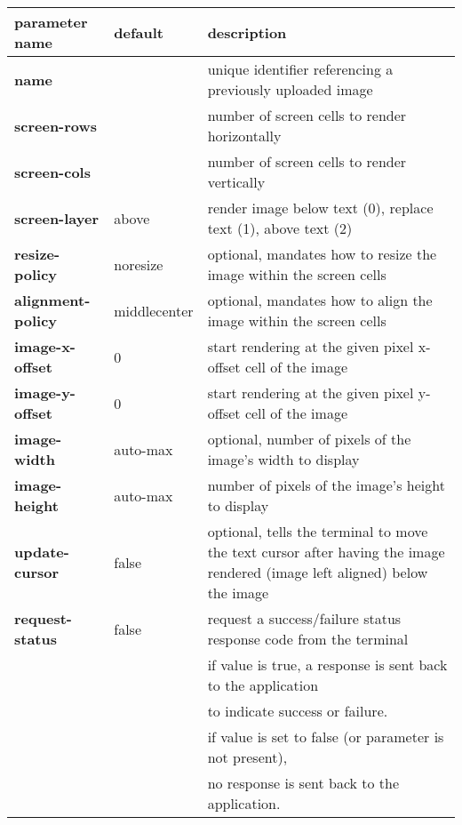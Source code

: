 \documentclass[a4paper]{article}
\begin{document}
\begin{tabular}{|m{3cm}|m{2cm}|m{10cm}|}
    \hline
    \textbf{parameter name}   & \textbf{default} & \textbf{description} \\
    \hline
    \textbf{name}             &                  & unique identifier referencing a previously uploaded image \\
    \textbf{screen-rows}      &                  & number of screen cells to render horizontally \\
    \textbf{screen-cols}      &                  & number of screen cells to render vertically \\
    \textbf{screen-layer}     & above            & render image below text (0), replace text (1), above text (2) \\
    \textbf{resize-policy}    & noresize         & optional, mandates how to resize the image within the screen cells \\
    \textbf{alignment-policy} & middlecenter     & optional, mandates how to align the image within the screen cells \\
    \textbf{image-x-offset}   & 0                & start rendering at the given pixel x-offset cell of the image \\
    \textbf{image-y-offset}   & 0                & start rendering at the given pixel y-offset cell of the image \\
    \textbf{image-width}      & auto-max         & optional, number of pixels of the image's width to display \\
    \textbf{image-height}     & auto-max         & number of pixels of the image's height to display \\
    \textbf{update-cursor}    & false            & optional, tells the terminal to move the text cursor after having the image rendered (image left aligned) below the image \\
    \textbf{request-status}   & false            & request a success/failure status response code from the terminal \\
                              &                  & if value is true, a response is sent back to the application \\
                              &                  & to indicate success or failure. \\
                              &                  & if value is set to false (or parameter is not present), \\
                              &                  & no response is sent back to the application. \\
    \hline
\end{tabular}
\end{document}
